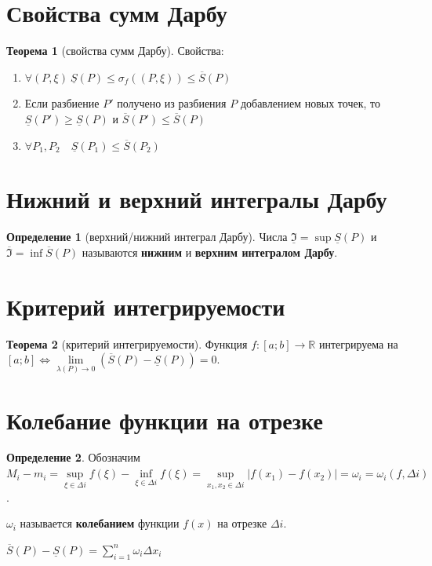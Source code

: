 \documentclass{report}
\theoremstyle{definition}
\newtheorem*{definition}{Определение}
\newtheorem*{theorem}{Теорема}
\begin{document}
\section{Свойства сумм Дарбу}

\begin{theorem}[свойства сумм Дарбу]
    Свойства:
    \begin{enumerate}
        \item $\forall(P,\xi) \ \underline{S}(P)\leqslant\sigma_{f}((P,\xi))\leqslant\overline{S}(P)$
        \item Если разбиение $P'$ получено из разбиения $P$ добавлением новых точек, то $\underline{S}
                  (P') \geqslant \underline{S}(P)$ и $\overline{S}(P')\leqslant\overline{S}(P)$
        \item $\forall P_{1},P_{2} \quad \underline{S}(P_{1})\leqslant\overline{S}(P_{2})$
    \end{enumerate}
\end{theorem}

\section{Нижний и верхний интегралы Дарбу}

\begin{definition}[верхний/нижний интеграл Дарбу]
    Числа $\underline{\mathfrak{I}}=\sup\underline{S}(P)$ и $\overline{\mathfrak{I}}=\inf\overline{S}(P)$ называются
    \textbf{нижним} и \textbf{верхним интегралом Дарбу}.
\end{definition}

\section{Критерий интегрируемости}

\begin{theorem}[критерий интегрируемости]
    Функция $f:[a;b]\rightarrow\mathbb{R}$ интегрируема на $[a;b] \iff \underset{\lambda (P)\rightarrow0}{\lim}
        (\overline{S}(P) - \underline{S}(P)) = 0$.
\end{theorem}

\section{Колебание функции на отрезке}

\begin{definition}
    Обозначим $M_{i} - m_{i} = \underset{\xi \in \Delta i}{\sup}f(\xi) - \underset{\xi\in\Delta i}{\inf}f(\xi)
        = \underset{x_{1},x_{2}\in\Delta i}{\sup}| f(x_{1}) - f(x_{2}) | = \omega_{i} = \omega_{i}(f,\Delta i)$.

    $\omega_{i}$ называется \textbf{колебанием} функции $f(x)$ на отрезке $\Delta i$.

    $\overline{S}(P) - \underline{S}(P) = \sum_{i = 1}^{n}\omega_{i}\Delta x_{i}$
\end{definition}
\end{document}

